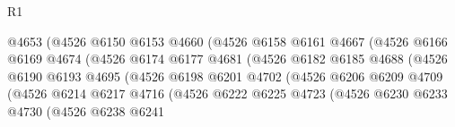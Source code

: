 \begin{lexlean}{R1}
\begin{coremodule}
                                    @4653
                                    (@4526
                                      @6150
                                      @6153
                                      @4660
                                      (@4526
                                        @6158
                                        @6161
                                        @4667
                                        (@4526
                                          @6166
                                          @6169
                                          @4674
                                          (@4526
                                            @6174
                                            @6177
                                            @4681
                                            (@4526
                                              @6182
                                              @6185
                                              @4688
                                              (@4526
                                                @6190
                                                @6193
                                                @4695
                                                (@4526
                                                  @6198
                                                  @6201
                                                  @4702
                                                  (@4526
                                                    @6206
                                                    @6209
                                                    @4709
                                                    (@4526
                                                      @6214
                                                      @6217
                                                      @4716
                                                      (@4526
                                                        @6222
                                                        @6225
                                                        @4723
                                                        (@4526
                                                          @6230
                                                          @6233
                                                          @4730
                                                          (@4526
                                                            @6238
                                                            @6241

\end{coremodule}
\end{lexlean}
